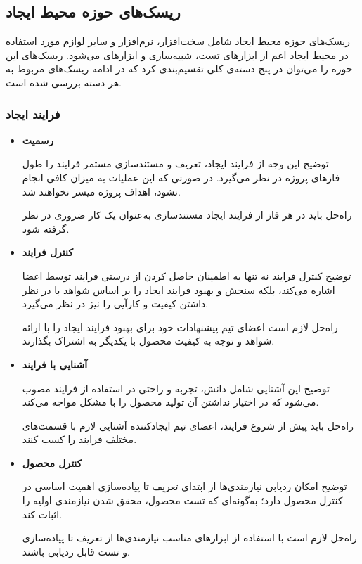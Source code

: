 \subsection{ریسک‌های حوزه محیط ایجاد}

ریسک‌های حوزه محیط ایجاد شامل سخت‌افزار، نرم‌افزار و سایر لوازم مورد استفاده در محیط ایجاد اعم از ابزارهای تست، شبیه‌سازی و ابزارهای  می‌شود. ریسک‌های این حوزه را می‌توان در پنج دسته‌ی کلی تقسیم‌بندی کرد که در ادامه ریسک‌های مربوط به هر دسته بررسی شده است.

\subsubsection{فرایند ایجاد}

\begin{itemize}
	
	\item 
	\textbf{رسمیت}

	توضیح \hspace*{1cm} 
این وجه از فرایند ایجاد، تعریف و مستندسازی مستمر فرایند را طول فازهای پروژه در نظر می‌گیرد. در صورتی که این عملیات به میزان کافی انجام نشود، اهداف پروژه میسر نخواهند شد.
	
	راه‌حل \hspace*{1cm} 
باید در هر فاز از فرایند ایجاد مستندسازی به‌عنوان یک کار ضروری در نظر گرفته شود.
		
	\item 
	\textbf{کنترل فرایند}

	توضیح \hspace*{1cm} 
کنترل فرایند نه تنها به اطمینان حاصل کردن از درستی فرایند توسط اعضا اشاره می‌کند، بلکه سنجش و بهبود فرایند ایجاد را بر اساس شواهد با در نظر داشتن کیفیت و کارآیی را نیز در نظر می‌گیرد.
	
	راه‌حل \hspace*{1cm} 
لازم است اعضای تیم پیشنهادات خود برای بهبود فرایند ایجاد را با ارائه شواهد و توجه به کیفیت محصول با یکدیگر به اشتراک بگذارند.
		
	\item 
	\textbf{آشنایی با فرایند}

	توضیح \hspace*{1cm} 
این آشنایی شامل دانش، تجربه و راحتی در استفاده از فرایند مصوب می‌شود که در اختیار نداشتن آن تولید محصول را با مشکل مواجه می‌کند.
	
	راه‌حل \hspace*{1cm} 
باید پیش از شروع فرایند، اعضای تیم ایجادکننده آشنایی لازم با قسمت‌های مختلف فرایند را کسب کنند.
		
	\item 
	\textbf{کنترل محصول}

	توضیح \hspace*{1cm} 
امکان ردیابی نیازمندی‌ها از ابتدای تعریف تا پیاده‌سازی اهمیت اساسی در کنترل محصول دارد؛ به‌گونه‌ای که تست محصول، محقق شدن نیازمندی اولیه را اثبات کند.
	
	راه‌حل \hspace*{1cm} 
لازم است با استفاده از ابزارهای مناسب نیازمندی‌ها از تعریف تا پیاده‌سازی و تست قابل ردیابی باشند.
		
\end{itemize}

